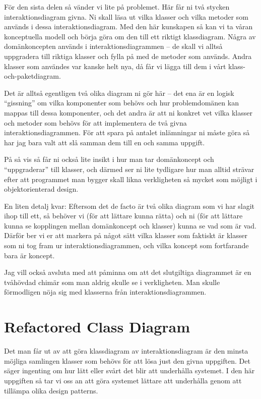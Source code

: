 \documentclass[8pt,oneside]{memoir}
\begin{document}
För den sista delen så vänder vi lite på problemet. Här får ni två stycken interaktionsdiagram givna. Ni skall läsa ut vilka klasser och vilka metoder som används i dessa interaktionsdiagram. Med den här kunskapen så kan vi ta våran konceptuella modell och börja göra om den till ett riktigt klassdiagram. Några av domänkoncepten används i interaktionsdiagrammen -- de skall vi alltså uppgradera till riktiga klasser och fylla på med de metoder som används. Andra klasser som användes var kanske helt nya, då får vi lägga till dem i vårt klass-och-paketdiagram.

Det är alltså egentligen två olika diagram ni gör här -- det ena är en logisk ``gissning'' om vilka komponenter som behövs och hur problemdomänen kan mappas till dessa komponenter, och det andra är att ni konkret vet vilka klasser och metoder som behövs för att implementera de två givna interaktionsdiagrammen. För att spara på antalet inlämningar ni måste göra så har jag bara valt att slå samman dem till en och samma uppgift.

På så vis så får ni också lite insikt i hur man tar domänkoncept och ``uppgraderar'' till klasser, och därmed ser ni lite tydligare hur man alltid strävar efter att programmet man bygger skall likna verkligheten så mycket som möjligt i objektorienterad design.

En liten detalj kvar: Eftersom det de facto är två olika diagram som vi har slagit ihop till ett, så behöver vi (för att lättare kunna rätta) och ni (för att lättare kunna se kopplingen mellan domänkoncept och klasser) kunna se vad som är vad. Därför ber vi er att markera på något sätt vilka klasser som faktiskt är klasser som ni tog fram ur interaktionsdiagrammen, och vilka koncept som fortfarande bara är koncept.

Jag vill också avsluta med att påminna om att det slutgiltiga diagrammet är en tvåhövdad chimär som man aldrig skulle se i verkligheten. Man skulle förmodligen nöja sig med klasserna från interaktionsdiagrammen.
\chapter{Refactored Class Diagram}
\label{sec:org5a8a152}
Det man får ut av att göra klassdiagram av interaktionsdiagram är den minsta möjliga samlingen klasser som behövs för att lösa just den givna uppgiften. Det säger ingenting om hur lätt eller svårt det blir att underhålla systemet. I den här uppgiften så tar vi oss an att göra systemet lättare att underhålla genom att tillämpa olika design patterns.
\end{document}
